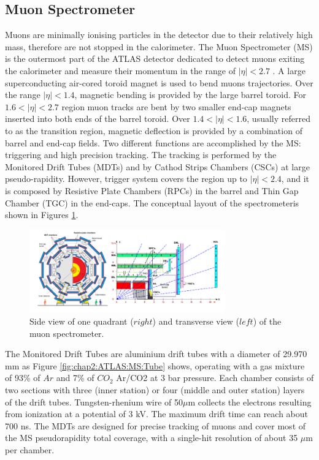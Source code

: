 \subsection{Muon Spectrometer}
\label{chap2:ATLAS:MS}
Muons are minimally ionising particles in the detector due to their relatively high mass, therefore are not stopped in the calorimeter. The Muon Spectrometer (MS) is the outermost part of the ATLAS detector dedicated to detect muons exiting the calorimeter and measure their momentum in the range of $|\eta| < 2.7$ \cite{Muon_TDR}. A large superconducting air-cored toroid magnet is used to bend muons trajectories. Over the range $|\eta| < 1.4$, magnetic bending is provided by the large barrel toroid. For $1.6<|\eta| < 2.7$ region muon tracks are bent by two smaller end-cap magnets inserted into both ends of the barrel toroid. Over $1.4<|\eta|<1.6$, usually referred to as the transition region, magnetic deflection is provided by a combination of barrel and end-cap fields. Two different functions are accomplished by the MS: triggering and high precision tracking. The tracking is performed by the Monitored Drift Tubes (MDTs) and by Cathod Strips Chambers (CSCs) at large pseudo-rapidity. However, trigger system covers the region up to $|\eta| < 2.4$, and it is composed by Resistive Plate Chambers (RPCs) in the barrel and Thin Gap Chamber (TGC) in the end-caps. The conceptual layout of the spectrometeris shown in Figures \ref{fig:chap2:ATLAS:MS}. \\
\begin{figure}[H]
    \centering
    \includegraphics[width=0.75\textwidth]{Ch2/Img/Muon.png}
    \caption{Side view of one quadrant ($right$) and transverse view ($left$) of the muon spectrometer.}
    \label{fig:chap2:ATLAS:MS}
\end{figure}
The Monitored Drift Tubes are aluminium drift tubes with a diameter of 29.970 mm as Figure \ref{fig:chap2:ATLAS:MS:Tube} shows, operating with a gas mixture of 93\% of $Ar$ and 7\% of $CO_2$ Ar/CO2 at 3 bar pressure. Each chamber consists of two sections with three (inner station) or four (middle and outer station) layers of the drift tubes. Tungsten-rhenium wire of 50$\mu$m collects the electrons resulting from ionization at a potential of 3 kV. The maximum drift time can reach about 700 ns. The MDTs are designed for precise tracking of muons and cover most of the MS pseudorapidity total coverage, with a single-hit resolution of about 35 $\mu$m per chamber. \\
